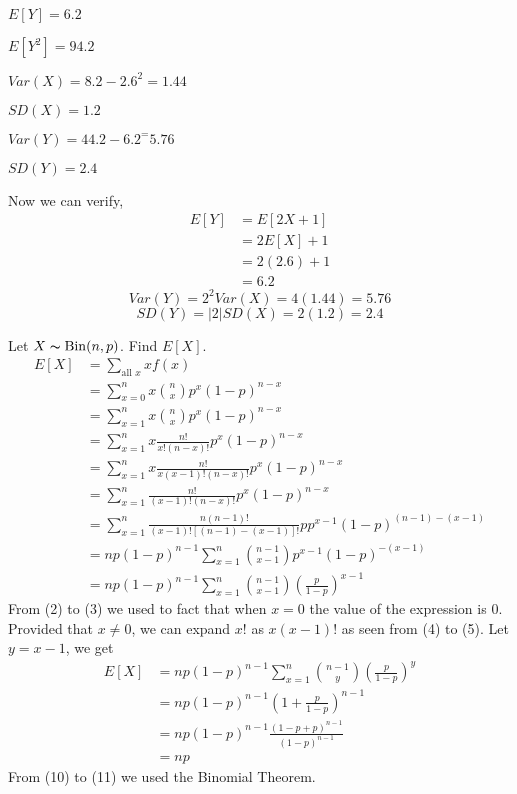 $ E[Y]=6.2 $

$ E[Y^2]=94.2 $

$ Var(X)=8.2-2.6^2=1.44 $

$ SD(X)=1.2 $

$ Var(Y)=44.2-6.2^=5.76 $

$SD(Y)=2.4$

Now we can verify,
\begin{align*}
    E[Y]&=E[2X+1]\\
    &=2E[X]+1\\
    &=2(2.6)+1\\
    &=6.2
\end{align*}
\[ Var(Y)=2^2 Var(X)=4(1.44)=5.76 \]
\[ SD(Y)=|2|SD(X)=2(1.2)=2.4 \]

Let $ X \thicksim \operatorname{Bin}(n,p) $. Find $ E[X] $.
\setcounter{equation}{0}
\begin{align}
    E[X]&=\sum\limits_{\text{all } x}xf(x)\\
    &=\sum\limits_{x=0}^{n}x \binom{n}{x}p^x(1-p)^{n-x}\\
    &=\sum\limits_{x=1}^{n}x \binom{n}{x}p^x(1-p)^{n-x}\\
    &=\sum\limits_{x=1}^{n}x \frac{n!}{x!(n-x)!}p^x(1-p)^{n-x}\\
    &=\sum\limits_{x=1}^{n}x \frac{n!}{x(x-1)!(n-x)!}p^x(1-p)^{n-x}\\
    &=\sum\limits_{x=1}^{n}\frac{n!}{(x-1)!(n-x)!}p^x(1-p)^{n-x}\\
    &=\sum\limits_{x=1}^{n}\frac{n(n-1)!}{(x-1)![(n-1)-(x-1)]!}pp^{x-1}(1-p)^{(n-1)-(x-1)}\\
    &=np(1-p)^{n-1}\sum\limits_{x=1}^{n}\binom{n-1}{x-1}p^{x-1}(1-p)^{-(x-1)}\\
    &=np(1-p)^{n-1}\sum\limits_{x=1}^{n}\binom{n-1}{x-1}\left(\frac{p}{1-p}\right)^{x-1}
\end{align}
From (2) to (3) we used to fact that when $ x=0 $ the value of the expression 
is $ 0 $. Provided that $ x\neq 0 $, we can expand $ x! $ as $ x(x-1)! $ as
seen from (4) to (5). Let $ y=x-1 $, we get
\begin{align}
    E[X]&=np(1-p)^{n-1}\sum\limits_{x=1}^{n}\binom{n-1}{y}\left(\frac{p}{1-p}\right)^{y}\\
    &=np(1-p)^{n-1}\left(1+\frac{p}{1-p}\right)^{n-1}\\
    &=np(1-p)^{n-1}\frac{(1-p+p)^{n-1}}{(1-p)^{n-1}}\\
    &=np
\end{align}
From (10) to (11) we used the Binomial Theorem.

